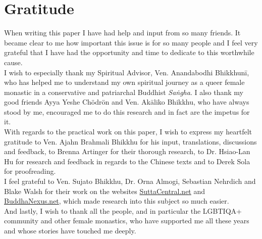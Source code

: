 \section{Gratitude}

When writing this paper I have had help and input from so many friends. It became clear to me how important this issue is for so many people and I feel very grateful that I have had the opportunity and time to dedicate to this worthwhile cause.\\

I wish to especially thank my Spiritual Advisor, Ven. Anandabodhi Bhikkhunī, who has helped me to understand my own spiritual journey as a queer female monastic in a conservative and patriarchal Buddhist {\em Saṅgha}. I also thank my good friends Ayya Yeshe Chödrön and Ven. Akāliko Bhikkhu, who have always stood by me, encouraged me to do this research and in fact are the impetus for it.\\

With regards to the practical work on this paper, I wish to express my heartfelt gratitude to Ven. Ajahn Brahmali Bhikkhu for his input, translations, discussions and feedback, to Brenna Artinger for their thorough research, to Dr. Hsiao-Lan Hu for research and feedback in regards to the Chinese texts and to Derek Sola for proofreading.\\

I feel grateful to Ven. Sujato Bhikkhu, Dr. Orna Almogi, Sebastian Nehrdich and Blake Walsh for their work on the websites \href{https://suttacentral.net/}{SuttaCentral.net} and \href{https://buddhanexus.net/}{BuddhaNexus.net}, which made research into this subject so much easier.\\

And lastly, I wish to thank all the people, and in particular the LGBTIQA+ community and other female monastics, who have supported me all these years and whose stories have touched me deeply.
